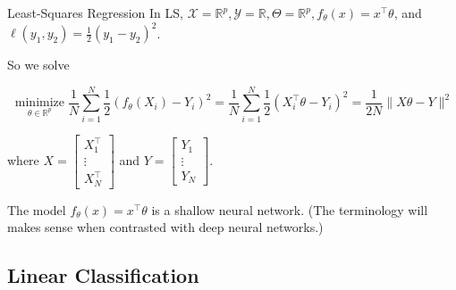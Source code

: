 \begin{frame}[allowframebreaks]

\begin{myexampleblock}{3.4}{Least-Squares Regression}
    In LS, $\mathcal{X}=\mathbb{R}^{p}, \mathcal{Y}=\mathbb{R}, \Theta=\mathbb{R}^{p}, f_{\theta}(x)=x^{\top} \theta$, and $\ell\left(y_{1}, y_{2}\right)=\frac{1}{2}\left(y_{1}-y_{2}\right)^{2}$.

    So we solve

    $$
    \underset{\theta \in \mathbb{R}^{p}}{\operatorname{minimize}} \frac{1}{N} \sum_{i=1}^{N} \frac{1}{2}\left(f_{\theta}\left(X_{i}\right)-Y_{i}\right)^{2}=\frac{1}{N} \sum_{i=1}^{N} \frac{1}{2}\left(X_{i}^{\top} \theta-Y_{i}\right)^{2}=\frac{1}{2 N}\|X \theta-Y\|^{2}
    $$

    where $X=\left[\begin{array}{c}X_{1}^{\top} \\ \vdots \\ X_{N}^{\top}\end{array}\right]$ and $Y=\left[\begin{array}{c}Y_{1} \\ \vdots \\ Y_{N}\end{array}\right]$.

    The model $f_{\theta}(x)=x^{\top} \theta$ is a shallow neural network. (The terminology will makes sense when contrasted with deep neural networks.)
\end{myexampleblock}

\end{frame}

\subsection{Linear Classification}

